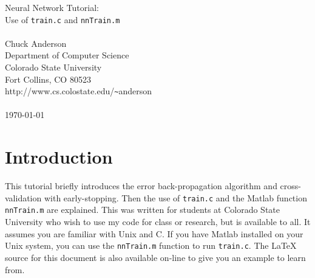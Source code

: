 
\oddsidemargin    	0.125in%
\textwidth      	6.25in
\evensidemargin		0pt
\topmargin        	-0.5in
\headheight		12pt
\headsep		26pt
\textheight		9.0in
\footheight		12pt
\footskip		37pt
\pagestyle{myheadings}
\thispagestyle{empty}%


\newcommand{\ls}[1]
   {\dimen0=\fontdimen6\the\font 
    \lineskip=#1\dimen0
    \advance\lineskip.5\fontdimen5\the\font
    \advance\lineskip-\dimen0
    \lineskiplimit=.9\lineskip
    \baselineskip=\lineskip
    \advance\baselineskip\dimen0
    \normallineskip\lineskip
    \normallineskiplimit\lineskiplimit
    \normalbaselineskip\baselineskip
    \ignorespaces
   }



\begin{center}
{\large Neural Network Tutorial: \\ Use of \verb'train.c' and \verb'nnTrain.m'}\\
~\\
Chuck Anderson\\
Department of Computer Science\\
Colorado State University\\
Fort Collins, CO 80523\\
http://www.cs.colostate.edu/\verb'~'anderson\\
~\\
\today
\end{center}

\section{Introduction}

This tutorial briefly introduces the error back-propagation algorithm and
cross-validation with early-stopping.  Then the use of \verb'train.c' and the
Matlab function \verb'nnTrain.m' are explained.  This was written for students
at Colorado State University who wish to use my code for class or research,
but is available to all.
It assumes you are familiar with Unix and C.  If you have Matlab  installed on
your Unix system, you can use the \verb'nnTrain.m' function to run
\verb'train.c'.  The LaTeX source for this document is also available on-line
to give you an example to learn from.

